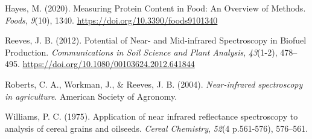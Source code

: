 \documentclass[
]{agujournal2019}
\newlength{\cslhangindent}
\newenvironment{CSLReferences}[2] %
 {\begin{list}{}{%
  \setlength{\itemindent}{0pt}
  \setlength{\leftmargin}{0pt}
  \setlength{\parsep}{0pt}
  \ifodd #1
   \setlength{\leftmargin}{\cslhangindent}
   \setlength{\itemindent}{-1\cslhangindent}
  \fi
  \setlength{\itemsep}{#2\baselineskip}}}
 {\end{list}}
\begin{document}
\begin{CSLReferences}{1}{0}
Hayes, M. (2020). Measuring {Protein} {Content} in {Food}: {An}
{Overview} of {Methods}. \emph{Foods}, \emph{9}(10), 1340.
\url{https://doi.org/10.3390/foods9101340}

Reeves, J. B. (2012). Potential of {Near}- and {Mid}-infrared
{Spectroscopy} in {Biofuel} {Production}. \emph{Communications in Soil
Science and Plant Analysis}, \emph{43}(1-2), 478--495.
\url{https://doi.org/10.1080/00103624.2012.641844}

Roberts, C. A., Workman, J., \& Reeves, J. B. (2004).
\emph{Near-infrared spectroscopy in agriculture}. American Society of
Agronomy.

Williams, P. C. (1975). Application of near infrared reflectance
spectroscopy to analysis of cereal grains and oilseeds. \emph{Cereal
Chemistry}, \emph{52}(4 p.561-576), 576--561.

\end{CSLReferences}
\end{document}
